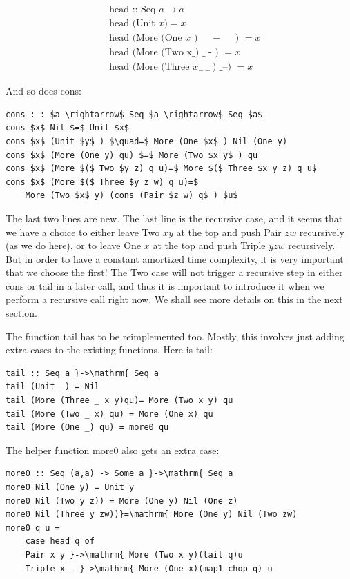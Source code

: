 \documentclass[10pt]{article}
\begin{document}
$$
\begin{aligned}
& \text { head :: Seq } a \rightarrow a \\
& \text { head (Unit } x)=x \\
& \text { head (More (One } x \text { ) } \quad-\quad \text { ) }=x \\
& \text { head (More (Two x_) _ - ) }=x \\
& \text { head (More (Three } x_{--} \text {) _--) }=x
\end{aligned}
$$

And so does cons:

\begin{verbatim}
cons : : $a \rightarrow$ Seq $a \rightarrow$ Seq $a$
cons $x$ Nil $=$ Unit $x$
cons $x$ (Unit $y$ ) $\quad=$ More (One $x$ ) Nil (One y)
cons $x$ (More (One y) qu) $=$ More (Two $x y$ ) qu
cons $x$ (More $($ Two $y z) q u)=$ More $($ Three $x y z) q u$
cons $x$ (More $($ Three $y z w) q u)=$
    More (Two $x$ y) (cons (Pair $z w) q$ ) $u$
\end{verbatim}

The last two lines are new. The last line is the recursive case, and it seems that we have a choice to either leave Two $x y$ at the top and push Pair $z w$ recursively (as we do here), or to leave One $x$ at the top and push Triple $y z w$ recursively. But in order to have a constant amortized time complexity, it is very important that we choose the first! The Two case will not trigger a recursive step in either cons or tail in a later call, and thus it is important to introduce it when we perform a recursive call right now. We shall see more details on this in the next section.

The function tail has to be reimplemented too. Mostly, this involves just adding extra cases to the existing functions. Here is tail:

\begin{verbatim}
tail :: Seq a }->\mathrm{ Seq a
tail (Unit _) = Nil
tail (More (Three _ x y)qu)= More (Two x y) qu
tail (More (Two _ x) qu) = More (One x) qu
tail (More (One _) qu) = more0 qu
\end{verbatim}

The helper function more0 also gets an extra case:

\begin{verbatim}
more0 :: Seq (a,a) -> Some a }->\mathrm{ Seq a
more0 Nil (One y) = Unit y
more0 Nil (Two y z)) = More (One y) Nil (One z)
more0 Nil (Three y zw))}=\mathrm{ More (One y) Nil (Two zw)
more0 q u =
    case head q of
    Pair x y }->\mathrm{ More (Two x y)(tail q)u
    Triple x_- }->\mathrm{ More (One x)(map1 chop q) u
\end{verbatim}
\end{document}
